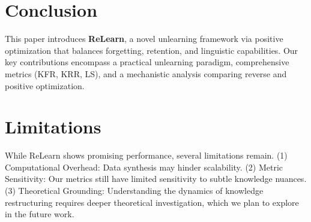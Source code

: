 \section{Conclusion}
This paper introduces \textbf{ReLearn}, a novel unlearning framework via positive optimization that balances forgetting, retention, and linguistic capabilities. 
Our key contributions encompass a practical unlearning paradigm, comprehensive metrics (KFR, KRR, LS), and a mechanistic analysis comparing reverse and positive optimization. 

\label{sec:bibtex}
\section*{Limitations}
While ReLearn shows promising performance, several limitations remain.
(1) Computational Overhead: Data synthesis may hinder scalability.
(2) Metric Sensitivity: Our metrics still have limited sensitivity to subtle knowledge nuances.
(3) Theoretical Grounding: Understanding the dynamics of knowledge restructuring requires deeper theoretical investigation, which we plan to explore in the future work.